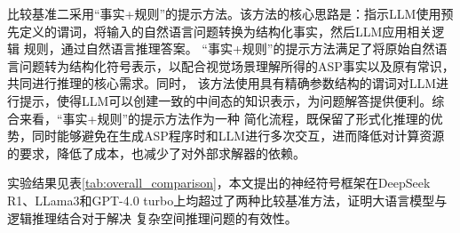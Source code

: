 比较基准二采用“事实+规则”的提示方法。该方法的核心思路是：指示LLM使用预先定义的谓词，将输入的自然语言问题转换为结构化事实，然后LLM应用相关逻辑
规则，通过自然语言推理答案。
“事实+规则”的提示方法满足了将原始自然语言问题转为结构化符号表示，以配合视觉场景理解所得的ASP事实以及原有常识，共同进行推理的核心需求。同时，
该方法使用具有精确参数结构的谓词对LLM进行提示，使得LLM可以创建一致的中间态的知识表示，为问题解答提供便利。综合来看，“事实+规则”的提示方法作为一种
简化流程，既保留了形式化推理的优势，同时能够避免在生成ASP程序时和LLM进行多次交互，进而降低对计算资源的要求，降低了成本，也减少了对外部求解器的依赖。

实验结果见表\ref{tab:overall_comparison}，本文提出的神经符号框架在DeepSeek R1、LLama3和GPT-4.0 turbo上均超过了两种比较基准方法，证明大语言模型与逻辑推理结合对于解决
复杂空间推理问题的有效性。

\begin{table}[h]
    \centering
    \small  %
    \renewcommand{\arraystretch}{1.2}  %
    \setlength{\tabcolsep}{5pt}  %
    \caption{不同模型及方法在各问题类型上的表现}
    \label{tab:overall_comparison}
\end{table}

